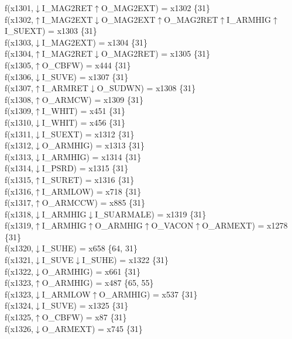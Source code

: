 f(x1301,$\downarrow$I\_MAG2RET$\uparrow$O\_MAG2EXT) = x1302 \{31\} \\  
f(x1302,$\uparrow$I\_MAG2EXT$\downarrow$O\_MAG2EXT$\uparrow$O\_MAG2RET$\uparrow$I\_ARMHIG$\uparrow$I\_SUEXT) = x1303 \{31\} \\  
f(x1303,$\downarrow$I\_MAG2EXT) = x1304 \{31\} \\  
f(x1304,$\uparrow$I\_MAG2RET$\downarrow$O\_MAG2RET) = x1305 \{31\} \\  
f(x1305,$\uparrow$O\_CBFW) = x444 \{31\} \\  
f(x1306,$\downarrow$I\_SUVE) = x1307 \{31\} \\  
f(x1307,$\uparrow$I\_ARMRET$\downarrow$O\_SUDWN) = x1308 \{31\} \\  
f(x1308,$\uparrow$O\_ARMCW) = x1309 \{31\} \\  
f(x1309,$\uparrow$I\_WHIT) = x451 \{31\} \\  
f(x1310,$\downarrow$I\_WHIT) = x456 \{31\} \\  
f(x1311,$\downarrow$I\_SUEXT) = x1312 \{31\} \\  
f(x1312,$\downarrow$O\_ARMHIG) = x1313 \{31\} \\  
f(x1313,$\downarrow$I\_ARMHIG) = x1314 \{31\} \\  
f(x1314,$\downarrow$I\_PSRD) = x1315 \{31\} \\  
f(x1315,$\uparrow$I\_SURET) = x1316 \{31\} \\  
f(x1316,$\uparrow$I\_ARMLOW) = x718 \{31\} \\  
f(x1317,$\uparrow$O\_ARMCCW) = x885 \{31\} \\  
f(x1318,$\downarrow$I\_ARMHIG$\downarrow$I\_SUARMALE) = x1319 \{31\} \\  
f(x1319,$\uparrow$I\_ARMHIG$\uparrow$O\_ARMHIG$\uparrow$O\_VACON$\uparrow$O\_ARMEXT) = x1278 \{31\} \\  
f(x1320,$\downarrow$I\_SUHE) = x658 \{64, 31\} \\  
f(x1321,$\downarrow$I\_SUVE$\downarrow$I\_SUHE) = x1322 \{31\} \\  
f(x1322,$\downarrow$O\_ARMHIG) = x661 \{31\} \\  
f(x1323,$\uparrow$O\_ARMHIG) = x487 \{65, 55\} \\  
f(x1323,$\downarrow$I\_ARMLOW$\uparrow$O\_ARMHIG) = x537 \{31\} \\  
f(x1324,$\downarrow$I\_SUVE) = x1325 \{31\} \\  
f(x1325,$\uparrow$O\_CBFW) = x87 \{31\} \\  
f(x1326,$\downarrow$O\_ARMEXT) = x745 \{31\} \\  
